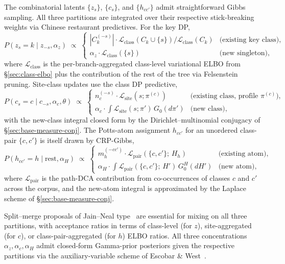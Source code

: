 The combinatorial latents $\{z_s\}$, $\{c_s\}$, and $\{h_{cc'}\}$
admit straightforward Gibbs sampling. All three partitions are
integrated over their respective stick-breaking weights via Chinese
restaurant predictives. For the key DP,
\[
P(z_s = k \mid z_{-s}, \alpha_z)
\;\propto\;
\begin{cases}
|C_k^{(-s)}| \cdot \mathcal{L}_{\text{class}}(C_k \cup \{s\}) / \mathcal{L}_{\text{class}}(C_k)
& \text{(existing key class)}, \\
\alpha_z \cdot \mathcal{L}_{\text{class}}(\{s\})
& \text{(new singleton)},
\end{cases}
\]
where $\mathcal{L}_{\text{class}}$ is the per-branch-aggregated
class-level variational ELBO from \S\ref{sec:class-elbo} plus the
contribution of the rest of the tree via Felsenstein pruning.
Site-class updates use the class DP predictive,
\[
P(c_s = c \mid c_{-s}, \alpha_c, \theta)
\;\propto\;
\begin{cases}
n_c^{(-s)} \cdot \mathcal{L}_{\text{site}}(s; \pi^{(c)})
& \text{(existing class, profile $\pi^{(c)}$)}, \\
\alpha_c \cdot \int \mathcal{L}_{\text{site}}(s; \pi')\, G_0(d\pi')
& \text{(new class)},
\end{cases}
\]
with the new-class integral closed form by the
Dirichlet--multinomial conjugacy of
\S\ref{sec:base-measure-conj}. The Potts-atom assignment
$h_{cc'}$ for an unordered class-pair $\{c, c'\}$ is itself drawn
by CRP-Gibbs,
\[
P(h_{cc'} = h \mid \text{rest}, \alpha_H)
\;\propto\;
\begin{cases}
m_h^{(-cc')} \cdot \mathcal{L}_{\text{pair}}(\{c, c'\};\, H_h)
& \text{(existing atom)}, \\
\alpha_H \cdot \int \mathcal{L}_{\text{pair}}(\{c, c'\};\, H')\, G_0^H(dH')
& \text{(new atom)},
\end{cases}
\]
where $\mathcal{L}_{\text{pair}}$ is the path-DCA contribution from
co-occurrences of classes $c$ and $c'$ across the corpus, and the
new-atom integral is approximated by the Laplace scheme of
\S\ref{sec:base-measure-conj}.

Split--merge proposals of Jain--Neal type~\citep{jainneal2004} are
essential for mixing on all three partitions, with acceptance ratios
in terms of class-level (for $z$), site-aggregated (for $c$), or
class-pair-aggregated (for $h$) ELBO ratios. All three concentrations
$\alpha_z, \alpha_c, \alpha_H$ admit closed-form Gamma-prior
posteriors given the respective partitions via the auxiliary-variable
scheme of Escobar \& West~\citep{escobarwest1995}.

